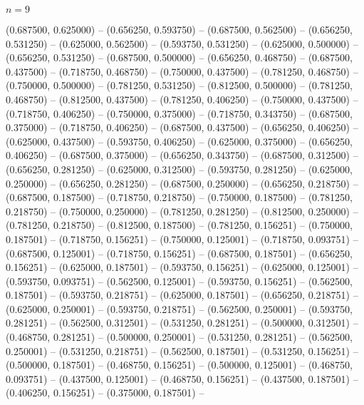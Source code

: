 \begin{zzfrac}{$n = 9$}
\begin{scope}[shift={(0,0.5)}]
  (0.687500, 0.625000)   --
  (0.656250, 0.593750)   --
  (0.687500, 0.562500)   --
  (0.656250, 0.531250)   --
  (0.625000, 0.562500)   --
  (0.593750, 0.531250)   --
  (0.625000, 0.500000)   --
  (0.656250, 0.531250)   --
  (0.687500, 0.500000)   --
  (0.656250, 0.468750)   --
  (0.687500, 0.437500)   --
  (0.718750, 0.468750)   --
  (0.750000, 0.437500)   --
  (0.781250, 0.468750)   --
  (0.750000, 0.500000)   --
  (0.781250, 0.531250)   --
  (0.812500, 0.500000)   --
  (0.781250, 0.468750)   --
  (0.812500, 0.437500)   --
  (0.781250, 0.406250)   --
  (0.750000, 0.437500)   --
  (0.718750, 0.406250)   --
  (0.750000, 0.375000)   --
  (0.718750, 0.343750)   --
  (0.687500, 0.375000)   --
  (0.718750, 0.406250)   --
  (0.687500, 0.437500)   --
  (0.656250, 0.406250)   --
  (0.625000, 0.437500)   --
  (0.593750, 0.406250)   --
  (0.625000, 0.375000)   --
  (0.656250, 0.406250)   --
  (0.687500, 0.375000)   --
  (0.656250, 0.343750)   --
  (0.687500, 0.312500)   --
  (0.656250, 0.281250)   --
  (0.625000, 0.312500)   --
  (0.593750, 0.281250)   --
  (0.625000, 0.250000)   --
  (0.656250, 0.281250)   --
  (0.687500, 0.250000)   --
  (0.656250, 0.218750)   --
  (0.687500, 0.187500)   --
  (0.718750, 0.218750)   --
  (0.750000, 0.187500)   --
  (0.781250, 0.218750)   --
  (0.750000, 0.250000)   --
  (0.781250, 0.281250)   --
  (0.812500, 0.250000)   --
  (0.781250, 0.218750)   --
  (0.812500, 0.187500)   --
  (0.781250, 0.156251)   --
  (0.750000, 0.187501)   --
  (0.718750, 0.156251)   --
  (0.750000, 0.125001)   --
  (0.718750, 0.093751)   --
  (0.687500, 0.125001)   --
  (0.718750, 0.156251)   --
  (0.687500, 0.187501)   --
  (0.656250, 0.156251)   --
  (0.625000, 0.187501)   --
  (0.593750, 0.156251)   --
  (0.625000, 0.125001)   --
  (0.593750, 0.093751)   --
  (0.562500, 0.125001)   --
  (0.593750, 0.156251)   --
  (0.562500, 0.187501)   --
  (0.593750, 0.218751)   --
  (0.625000, 0.187501)   --
  (0.656250, 0.218751)   --
  (0.625000, 0.250001)   --
  (0.593750, 0.218751)   --
  (0.562500, 0.250001)   --
  (0.593750, 0.281251)   --
  (0.562500, 0.312501)   --
  (0.531250, 0.281251)   --
  (0.500000, 0.312501)   --
  (0.468750, 0.281251)   --
  (0.500000, 0.250001)   --
  (0.531250, 0.281251)   --
  (0.562500, 0.250001)   --
  (0.531250, 0.218751)   --
  (0.562500, 0.187501)   --
  (0.531250, 0.156251)   --
  (0.500000, 0.187501)   --
  (0.468750, 0.156251)   --
  (0.500000, 0.125001)   --
  (0.468750, 0.093751)   --
  (0.437500, 0.125001)   --
  (0.468750, 0.156251)   --
  (0.437500, 0.187501)   --
  (0.406250, 0.156251)   --
  (0.375000, 0.187501)   --

\end{scope}
\end{zzfrac}
